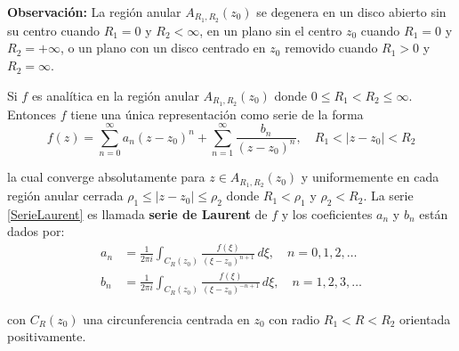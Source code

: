 \textbf{Observación:} La región anular $A_{R_1,R_2}(z_0)$ se degenera en un disco abierto sin su centro cuando $R_1 = 0$ y $R_2 < \infty$, en un plano sin el centro $z_0$ cuando $R_1 = 0$ y $R_2 = + \infty$, o un plano con un disco centrado en $z_0$ removido cuando $R_1 > 0$ y $R_2 = \infty$.

\begin{teorema}
Si $f$ es analítica en la región anular $A_{R_1,R_2}(z_0)$ donde $0 \leq R_1 < R_2 \leq \infty$. Entonces $f$ tiene una única representación como serie de la forma
\begin{equation}
f(z) = \sum_{n=0}^{\infty} a_n (z-z_0)^n + \sum_{n=1}^{\infty} \frac{b_n}{(z-z_0)^n}, \quad R_1 < |z-z_0| < R_2    \label{SerieLaurent}
\end{equation}

la cual converge absolutamente para $z \in A_{R_1,R_2}(z_0)$ y uniformemente en cada región anular cerrada $\rho_1 \leq |z-z_0| \leq \rho_2$ donde $R_1 < \rho_1$ y $\rho_2 < R_2$. La serie \eqref{SerieLaurent} es llamada \textbf{serie de Laurent} de $f$ y los coeficientes $a_n$ y $b_n$ están dados por:
\begin{align}
    a_n &= \frac{1}{2\pi i} \int_{C_{R}(z_0)} \frac{f(\xi)}{(\xi-z_0)^{n+1}} \,d \xi, \quad n = 0,1,2, \dots \label{CoeLauranet1} \\
    b_n &= \frac{1}{2\pi i} \int_{C_{R}(z_0)} \frac{f(\xi)}{(\xi-z_0)^{-n+1}} \,d \xi, \quad n = 1,2,3, \dots \label{CoeLauranet2}
\end{align}

con $C_{R}(z_0)$ una circunferencia centrada en $z_0$ con radio $R_1 < R < R_2$ orientada positivamente.
\end{teorema}

